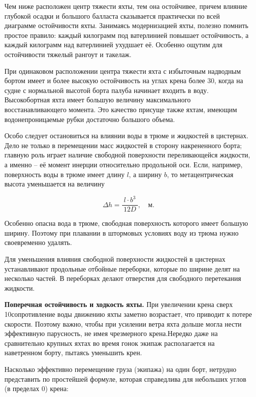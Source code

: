 Чем ниже расположен центр тяжести яхты, тем она остойчивее, причем влияние глубокой осадки и большого балласта сказывается практически по всей диаграмме остойчивости яхты. Занимаясь модернизацией яхты, полезно помнить простое правило: каждый килограмм под ватерлинией повышает остойчивость, а каждый килограмм над ватерлинией ухудшает её. Особенно ощутим для остойчивости тяжелый рангоут и такелаж.

При одинаковом расположении центра тяжести яхта с избыточным надводным бортом имеет и более высокую остойчивость на углах крена более 30\gr, когда на судне с нормальной высотой борта палуба начинает входить в воду. Высокобортная яхта имеет большую величину максимального восстанавливающего момента. Это качество присуще также яхтам, имеющим водонепроницаемые рубки достаточно большого объема. 

Особо следует остановиться на влиянии воды в трюме и жидкостей в цистернах. Дело не только в перемещении масс жидкостей в сторону накрененного борта; главную роль играет наличие свободной поверхности переливающейся жидкости, а именно \--- её момент инерции относительно продольной оси. Если, например, поверхность воды в трюме имеет длину $l$, а ширину $b$, то метацентрическая высота уменьшается на величину

\begin{equation}
  \Delta h = \frac{l \cdot b^3}{\ 12D\ }, \quad \text{м.}
\end{equation}

Особенно опасна вода в трюме, свободная поверхность которого имеет большую ширину. Поэтому при плавании в штормовых условиях воду из трюма нужно своевременно удалять.

Для уменьшения влияния свободной поверхности жидкостей в цистернах устанавливают продольные отбойные переборки, которые по ширине делят на несколько частей. В переборках делают отверстия для свободного перетекания жидкости.

\textbf{Поперечная остойчивость и ходкость яхты.} При увеличении крена сверх 10\gr сопротивление воды движению яхты заметно возрастает, что приводит к потере скорости. Поэтому важно, чтобы при усилении ветра яхта дольше могла нести эффективную парусность, не имея чрезмерного крена.Нередко даже на сравнительно крупных яхтах во время гонок экипаж располагается на наветренном борту, пытаясь уменьшить крен. 

Насколько эффективно перемещение груза (экипажа) на один борт, нетрудно представить по простейшей формуле, которая справедлива для небольших углов (в пределах 0\gr) крена:


